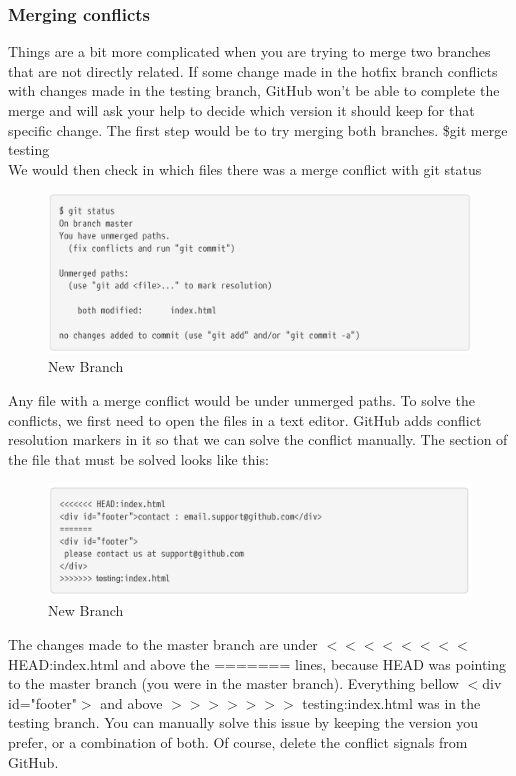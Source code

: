 \documentclass[12pt]{article}
\begin{document}
    \subsubsection{Merging conflicts}
    Things are a bit more complicated when you are trying to merge two branches that are not directly related. If some change made in the hotfix branch conflicts with changes made in the testing branch, GitHub won't be able to complete the merge and will ask your help to decide which version it should keep for that specific change. The first step would be to try merging both branches.
     \vspace{0.2 in}
    \indent\indent \$git merge testing \\
    We would then check in which files there was a merge conflict with git status   
    \begin{figure}[h]
	\caption{New Branch}
	\includegraphics[scale=0.5]{figure9}
	\centering
    \end{figure} 
    \vspace{5 in}
    Any file with a merge conflict would be under unmerged paths. To solve the conflicts, we first need to open the files in a text editor. GitHub adds conflict resolution markers in it so that we can solve the conflict manually. The section of the file that must be solved looks like this:
    \begin{figure}[h]
	\caption{New Branch}
	\includegraphics[scale=0.5]{figure10}
	\centering
    \end{figure} 
    \vspace{0.2 in}
    The changes made to the master branch are under $<<<<<<<<$ HEAD:index.html and above the ======= lines, because HEAD was pointing to the master branch (you were in the master branch). Everything bellow $<$div id="footer"$>$ and above  $>>>>>>>$ testing:index.html was in the testing branch. You can manually solve this issue by keeping the version you prefer, or a combination of both. Of course, delete the conflict signals from GitHub. \\
\end{document}
